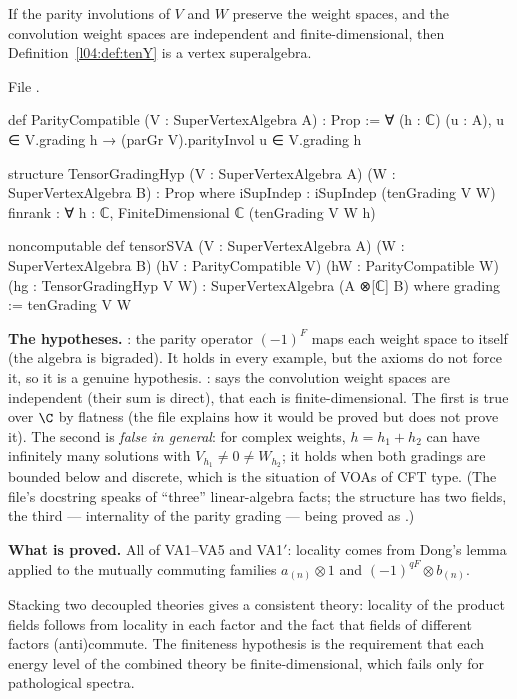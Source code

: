 \begin{theorem}\label{l04:thm:tensor}
If the parity involutions of $V$ and $W$ preserve the weight spaces, and the convolution weight
spaces are independent and finite-dimensional, then Definition~\ref{l04:def:tenY} is a vertex
superalgebra.
\end{theorem}
\noindent File .
\begin{leancode}
def ParityCompatible (V : SuperVertexAlgebra A) : Prop :=
  ∀ (h : ℂ) (u : A), u ∈ V.grading h → (parGr V).parityInvol u ∈ V.grading h

structure TensorGradingHyp (V : SuperVertexAlgebra A) (W : SuperVertexAlgebra B) : Prop where
  iSupIndep : iSupIndep (tenGrading V W)
  finrank : ∀ h : ℂ, FiniteDimensional ℂ (tenGrading V W h)

noncomputable def tensorSVA (V : SuperVertexAlgebra A) (W : SuperVertexAlgebra B)
    (hV : ParityCompatible V) (hW : ParityCompatible W) (hg : TensorGradingHyp V W) :
    SuperVertexAlgebra (A ⊗[ℂ] B) where
  grading := tenGrading V W
\end{leancode}
\begin{dictionary}
\textbf{The hypotheses.} : the parity operator $(-1)^F$ maps each weight space to
itself (the algebra is bigraded). It holds in every example, but the 
axioms do not force it, so it is a genuine hypothesis. :  says
the convolution weight spaces are independent (their sum is direct),  that each is
finite-dimensional. The first is true over $\C$ by flatness (the file explains how it would be proved
but does not prove it). The second is \emph{false in general}: for complex weights, $h = h_1+h_2$ can
have infinitely many solutions with $V_{h_1}\ne0\ne W_{h_2}$; it holds when both gradings are bounded
below and discrete, which is the situation of VOAs of CFT type. (The file's docstring speaks of
``three'' linear-algebra facts; the structure has two fields, the third --- internality of the parity
grading --- being proved as \allowbreak{}.)

\textbf{What is proved.} All of VA1--VA5 and VA1$'$: locality comes from Dong's lemma applied to the
mutually commuting families $a_{(n)}\otimes1$ and $(-1)^{qF}\otimes b_{(n)}$.
\end{dictionary}
\begin{physics}
Stacking two decoupled theories gives a consistent theory: locality of the product fields follows
from locality in each factor and the fact that fields of different factors (anti)commute. The
finiteness hypothesis is the requirement that each energy level of the combined theory be
finite-dimensional, which fails only for pathological spectra.
\end{physics}
